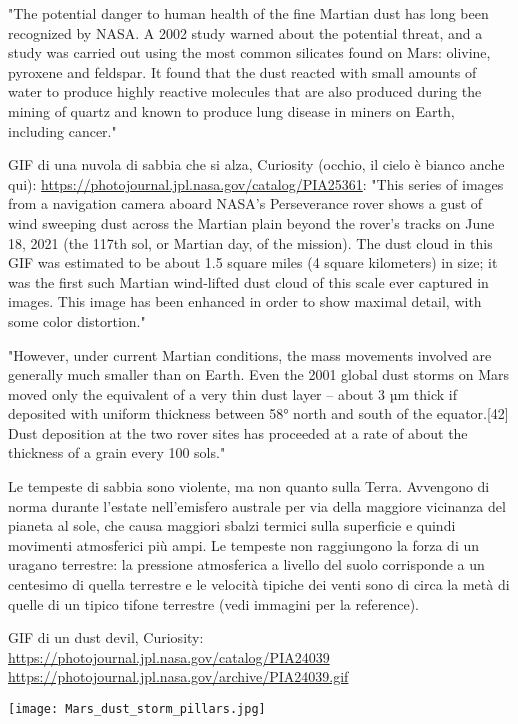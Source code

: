 \documentclass[a4paper,10pt,openany,oneside]{memoir}
\begin{document}
"The potential danger to human health of the fine Martian dust has long been recognized by NASA. A 2002 study warned about the potential threat, and a study was carried out using the most common silicates found on Mars: olivine, pyroxene and feldspar. It found that the dust reacted with small amounts of water to produce highly reactive molecules that are also produced during the mining of quartz and known to produce lung disease in miners on Earth, including cancer."

GIF di una nuvola di sabbia che si alza, Curiosity (occhio, il cielo è bianco anche qui): \url{https://photojournal.jpl.nasa.gov/catalog/PIA25361}: "This series of images from a navigation camera aboard NASA's Perseverance rover shows a gust of wind sweeping dust across the Martian plain beyond the rover's tracks on June 18, 2021 (the 117th sol, or Martian day, of the mission). The dust cloud in this GIF was estimated to be about 1.5 square miles (4 square kilometers) in size; it was the first such Martian wind-lifted dust cloud of this scale ever captured in images. This image has been enhanced in order to show maximal detail, with some color distortion."

"However, under current Martian conditions, the mass movements involved are generally much smaller than on Earth. Even the 2001 global dust storms on Mars moved only the equivalent of a very thin dust layer – about 3 µm thick if deposited with uniform thickness between 58° north and south of the equator.[42] Dust deposition at the two rover sites has proceeded at a rate of about the thickness of a grain every 100 sols."

Le tempeste di sabbia sono violente, ma non quanto sulla Terra. Avvengono di norma durante l'estate nell'emisfero australe per via della maggiore vicinanza del pianeta al sole, che causa maggiori sbalzi termici sulla superficie e quindi movimenti atmosferici più ampi. Le tempeste non raggiungono la forza di un uragano terrestre: la pressione atmosferica a livello del suolo corrisponde a un centesimo di quella terrestre e le velocità tipiche dei venti sono di circa la metà di quelle di un tipico tifone terrestre (vedi immagini per la reference).

GIF di un dust devil, Curiosity: \url{https://photojournal.jpl.nasa.gov/catalog/PIA24039} \url{https://photojournal.jpl.nasa.gov/archive/PIA24039.gif}



\texttt{[image: Mars\_dust\_storm\_pillars.jpg]}
\end{document}
